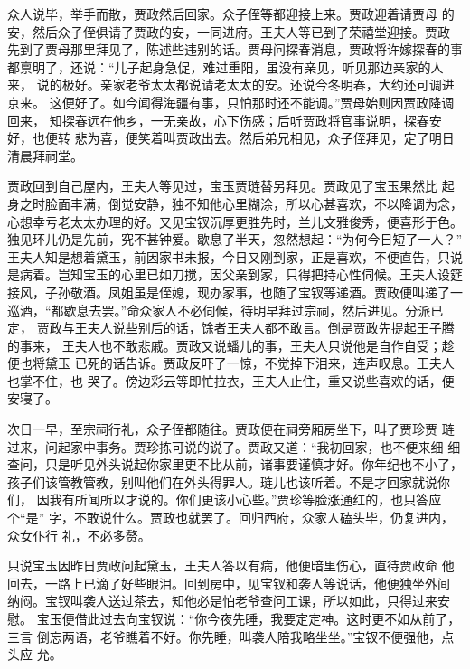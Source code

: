 众人说毕，举手而散，贾政然后回家。众子侄等都迎接上来。贾政迎着请贾母
的安，然后众子侄俱请了贾政的安，一同进府。王夫人等已到了荣禧堂迎接。贾政
先到了贾母那里拜见了，陈述些违别的话。贾母问探春消息，贾政将许嫁探春的事
都禀明了，还说：“儿子起身急促，难过重阳，虽没有亲见，听见那边亲家的人来，
说的极好。亲家老爷太太都说请老太太的安。还说今冬明春，大约还可调进京来。
这便好了。如今闻得海疆有事，只怕那时还不能调。”贾母始则因贾政降调回来，
知探春远在他乡，一无亲故，心下伤感；后听贾政将官事说明，探春安好，也便转
悲为喜，便笑着叫贾政出去。然后弟兄相见，众子侄拜见，定了明日清晨拜祠堂。

贾政回到自己屋内，王夫人等见过，宝玉贾琏替另拜见。贾政见了宝玉果然比
起身之时脸面丰满，倒觉安静，独不知他心里糊涂，所以心甚喜欢，不以降调为念，
心想幸亏老太太办理的好。又见宝钗沉厚更胜先时，兰儿文雅俊秀，便喜形于色。
独见环儿仍是先前，究不甚钟爱。歇息了半天，忽然想起：“为何今日短了一人？”
王夫人知是想着黛玉，前因家书未报，今日又刚到家，正是喜欢，不便直告，只说
是病着。岂知宝玉的心里已如刀搅，因父亲到家，只得把持心性伺候。王夫人设筵
接风，子孙敬酒。凤姐虽是侄媳，现办家事，也随了宝钗等递酒。贾政便叫递了一
巡酒，“都歇息去罢。”命众家人不必伺候，待明早拜过宗祠，然后进见。分派已定，
贾政与王夫人说些别后的话，馀者王夫人都不敢言。倒是贾政先提起王子腾的事来，
王夫人也不敢悲戚。贾政又说蟠儿的事，王夫人只说他是自作自受；趁便也将黛玉
已死的话告诉。贾政反吓了一惊，不觉掉下泪来，连声叹息。王夫人也掌不住，也
哭了。傍边彩云等即忙拉衣，王夫人止住，重又说些喜欢的话，便安寝了。

次日一早，至宗祠行礼，众子侄都随往。贾政便在祠旁厢房坐下，叫了贾珍贾
琏过来，问起家中事务。贾珍拣可说的说了。贾政又道：“我初回家，也不便来细
细查问，只是听见外头说起你家里更不比从前，诸事要谨慎才好。你年纪也不小了，
孩子们该管教管教，别叫他们在外头得罪人。琏儿也该听着。不是才回家就说你们，
因我有所闻所以才说的。你们更该小心些。”贾珍等脸涨通红的，也只答应个“是”
字，不敢说什么。贾政也就罢了。回归西府，众家人磕头毕，仍复进内，众女仆行
礼，不必多赘。

只说宝玉因昨日贾政问起黛玉，王夫人答以有病，他便暗里伤心，直待贾政命
他回去，一路上已滴了好些眼泪。回到房中，见宝钗和袭人等说话，他便独坐外间
纳闷。宝钗叫袭人送过茶去，知他必是怕老爷查问工课，所以如此，只得过来安慰。
宝玉便借此过去向宝钗说：“你今夜先睡，我要定定神。这时更不如从前了，三言
倒忘两语，老爷瞧着不好。你先睡，叫袭人陪我略坐坐。”宝钗不便强他，点头应
允。

